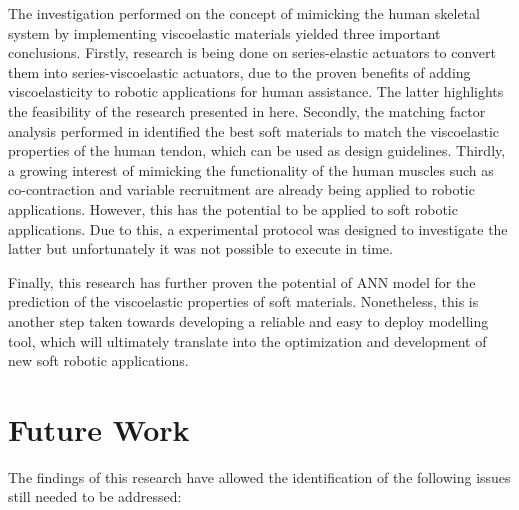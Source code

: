 The investigation performed on the concept of mimicking the human skeletal system by implementing viscoelastic materials yielded three important conclusions. Firstly, research is being done on series-elastic actuators to convert them into series-viscoelastic actuators, due to the proven benefits of adding viscoelasticity to robotic applications for human assistance. The latter highlights the feasibility of the research presented in here. Secondly, the matching factor analysis performed in  identified the best soft materials to match the viscoelastic properties of the human tendon, which can be used as design guidelines. Thirdly, a growing interest of mimicking the functionality of the human muscles such as co-contraction and variable recruitment are already being applied to robotic applications. However, this has the potential to be applied to soft robotic applications. Due to this, a experimental protocol was designed to investigate the latter but unfortunately it was not possible to execute in time.

Finally, this research has further proven the potential of ANN model for the prediction of the viscoelastic properties of soft materials. Nonetheless, this is another step taken towards developing a reliable and easy to deploy modelling tool, which will ultimately translate into the optimization and development of new soft robotic applications.

\section{Future Work}

The findings of this research have allowed the identification of the following issues still needed to be addressed:

